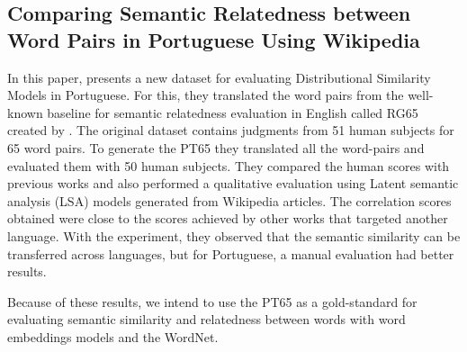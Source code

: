 \subsection{Comparing Semantic Relatedness between Word Pairs in Portuguese Using Wikipedia}

In this paper,  presents a new dataset for evaluating Distributional Similarity Models in Portuguese. For this, they translated the word pairs from the well-known baseline for semantic relatedness evaluation in English called RG65 created by . The original dataset contains judgments from 51 human subjects for 65 word pairs. To generate the PT65 they translated all the word-pairs and evaluated them with 50 human subjects. They compared the human scores with previous works and also performed a qualitative evaluation using Latent semantic analysis (LSA) models generated from Wikipedia articles. The correlation scores obtained were close to the scores achieved by other works that targeted another language. With the experiment, they observed that the semantic similarity can be transferred across languages, but for Portuguese, a manual evaluation had better results. 

Because of these results, we intend to use the PT65 as a gold-standard for evaluating semantic similarity and relatedness between words with word embeddings models and the WordNet.

 

